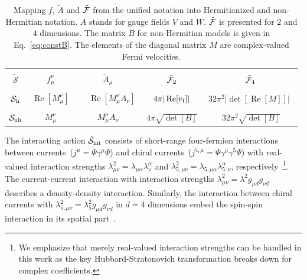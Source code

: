 \documentclass[prl,aps,showpacs,twocolumn,preprintnumbers,
amsmath,amssymb,superscriptaddress,longbibliography]{revtex4-1}
\renewcommand{\Re}{\mathop{\mathrm{Re}}}
\begin{document}
\begin{table}
\begin{center}
\begin{tabular}{c c  c  c  c}
\hline
\hline
\\[-0.95em]
$\tilde{\mathcal{S}}$ &  $f_{\mu}^{\nu}$ & $\tilde{A}_{\mu}$ &    $\tilde{\cal F}_{2}$ &  $\tilde{\cal F}_{4}$
    \\[-0.05em]
     \hline
    &&\\[-0.05em]
     $\mathcal{S}_{\rm{h}}$  & $\, \Re[M_{\mu}^{\nu}] \, $   & $\, \quad \Re[M_{\mu}^{\nu} A_{\nu}]\, $  &
     $\, 4 \pi |\Re[v_{\rm f} ]| \,$  & $\, 32 \pi^2 |\det[\Re[M]]| $ \,
    \\[-0.05em]
    &&\\[-0.05em]
     $\mathcal{S}_{\rm{nh}}$ & $\, M_{\mu}^{\nu} \,$ &$\, M_{\mu}^{\nu} A_{\nu}\, $ 
     & $\, 4 \pi \sqrt{\det[B]} \,$ & $\, 32 \pi^2 \sqrt{\det[B]}$
      \\[-0.05em]
    \hline
\hline
\end{tabular}
\end{center}
\caption{\label{tab:convertI} Mapping $f$, $\tilde{A}$ and $\tilde{\cal F}$ from the unified notation into Hermitianized and non-Hermitian notation. $A$ stands for gauge fields $V$ and $W$.  $\tilde{\cal F}$ is presented for $2$ and $4$ dimensions. The matrix $B$ for non-Hermitian models is given in Eq.~\eqref{eq:constB}. The elements of the diagonal matrix $M$ are complex-valued Fermi velocities.
}
\end{table}



The interacting action $\tilde{\cal S}_{\rm int}$ consists of short-range four-fermion interactions between currents~($j^{\mu}= \overline{\Psi} \gamma^{\mu} \Psi$) and chiral currents~($j^{5,\mu}= \overline{\Psi}  \gamma^{\mu}  \gamma^{5} \Psi$) with real-valued interaction strengths $\lambda_{\mu \nu}^{2}=\lambda_{\mu \alpha} \lambda_{\nu}^{\alpha}$ and $\lambda_{5,\mu \nu}^{2}=\lambda_{5,\mu \alpha} \lambda_{5,\nu}^{\alpha}$, respectively~\footnote{We emphasize that merely real-valued interaction strengths can be handled in this work as the key Hubbard-Stratonovich transformation breaks down for complex coefficients.}. The current-current interaction with interaction strengths $\lambda_{\mu \nu}^{2}=\lambda^{2} g_{\mu d} g_{\nu d}$ describes a density-density interaction. Similarly, the interaction between chiral currents with $\lambda_{5,\mu \nu}^{2}=\lambda^{2}_{5} g_{\mu d} g_{\nu d}$ in $d=4$ dimensions embed the spin-spin interaction in its spatial part~\cite{Parhizkar2023}.
\end{document}
